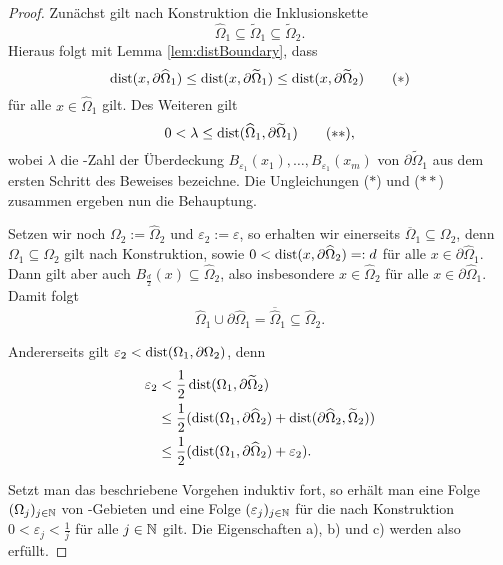 \begin{proof}
  Zunächst gilt nach Konstruktion die Inklusionskette
  $$
  \widehat\Omega_1 \subseteq \widetilde\Omega_1 \subseteq \widetilde\Omega_2.
  $$
  Hieraus folgt mit Lemma \ref{lem:distBoundary}, dass
  \begin{displaymath}
    \operatorname{dist}(x,\partial\widehat\Omega_1) 
    \leq \operatorname{dist}(x,\partial\widetilde\Omega_1) 
    \leq \operatorname{dist}(x,\partial\widetilde\Omega_2) \tag{$\ast$}
  \end{displaymath}
  für alle $x \in \widehat\Omega_1$ gilt.
  Des Weiteren gilt 
  \begin{displaymath}
  0 < \lambda \leq \operatorname{dist}(\widehat\Omega_1,\partial\widetilde\Omega_1) \tag{$\ast\ast$},
  \end{displaymath}
  wobei $\lambda$ die \lebesgue\hyp{}Zahl der Überdeckung $B_{\varepsilon_1}(x_1),\dots,B_{\varepsilon_1}(x_m)$ von $\partial\widetilde\Omega_1$ aus dem ersten Schritt des Beweises bezeichne.
  Die Ungleichungen ($\ast$) und ($\ast\ast$) zusammen ergeben nun die Behauptung.

  Setzen wir noch $\Omega_2 := \widehat\Omega_2$ und $\varepsilon_2 := \varepsilon$, so erhalten wir einerseits $\overline\Omega_1 \subseteq \Omega_2$, denn $\Omega_1 \subseteq \Omega_2$ gilt nach Konstruktion, sowie $0 < \operatorname{dist}(x,\partial\widehat\Omega_2) =: d$ für alle $x \in \partial\widehat\Omega_1$. Dann gilt aber auch $B_{\frac{d}{2}}(x) \subseteq \widehat\Omega_2$, also insbesondere $x \in \widehat\Omega_2$ für alle $x \in \partial\widehat\Omega_1$. Damit folgt 
  $$
  \widehat\Omega_1 \cup \partial\widehat\Omega_1 = \overline{\widehat\Omega}_1 \subseteq \widehat\Omega_2.
  $$

  Andererseits gilt $\varepsilon_2 < \operatorname{dist}(\Omega_1, \partial\Omega_2)$, denn
  \begin{align*}
  \varepsilon_2 
  &< \frac{1}{2} \operatorname{dist}(\Omega_1, \partial\widetilde\Omega_2) \\
  & \leq \frac{1}{2} (\operatorname{dist}(\Omega_1, \partial\widehat\Omega_2) + \operatorname{dist}(\partial\widehat\Omega_2, \widetilde\Omega_2)) \\
  & \leq \frac{1}{2} (\operatorname{dist}(\Omega_1, \partial\widehat\Omega_2) + \varepsilon_2).
  \end{align*}

  Setzt man das beschriebene Vorgehen induktiv fort, so erhält man eine Folge $(\Omega_j)_{j \in \mathbb{N}}$ von \lipschitz\hyp{}Gebieten und eine Folge $(\varepsilon_j)_{j \in \mathbb{N}}$ für die nach Konstruktion $0 < \varepsilon_j < \tfrac{1}{j}$ für alle $j \in \mathbb{N}$ gilt.
  Die Eigenschaften a), b) und c) werden also erfüllt.


\end{proof}
